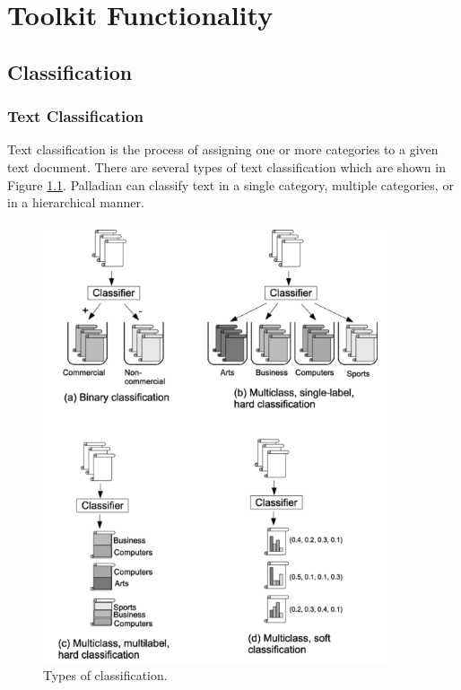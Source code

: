\documentclass[a4paper,twoside]{book}      %
\begin{document}
\chapter{Toolkit Functionality}
\section{Classification}

\subsection{Text Classification}
Text classification is the process of assigning one or more categories to a given text document. There are several types of text classification which are shown in Figure \ref{fig:typesOfClassification}. Palladian can classify text in a single category, multiple categories, or in a hierarchical manner.

\begin{figure}[ht!]
\centering
\includegraphics[width=4in]{img/typesOfClassification.png}
\caption{Types of classification\cite{qi2009web}.}
\label{fig:typesOfClassification}
\end{figure}
\end{document}
